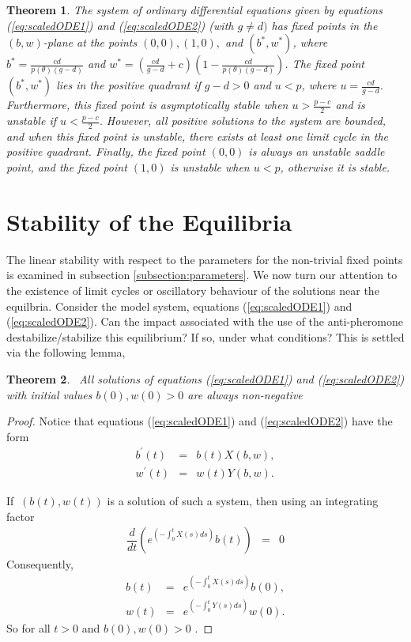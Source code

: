 \documentclass[review,authoryear]{elsarticle}
\newtheorem{theorem}{Theorem}[section]
\begin{document}
\begin{theorem}
  The system of ordinary differential equations given by equations (\ref{eq:scaledODE1}) and (\ref{eq:scaledODE2}) (with $g\ne d)$ has fixed points in the $(b,w)$-plane at the points $(0,0), (1,0),$ and $(b^*,w^*)$, where $b^*=\frac{cd}{p(\theta)(g-d)}$ and
$w^*=\left(\frac{cd}{g-d}+c\right)\left(1-\frac{cd}{p(\theta)(g-d)}\right)$. 
 The  fixed point $(b^*,w^*)$ lies in the positive quadrant if $g-d>0$ and $u<p$, where $u=\frac{cd}{g-d}.$
Furthermore, this fixed point is asymptotically stable when $u>\frac{p-c}{2}$ and is unstable if $u<\frac{p-c}{2}.$ However, all positive solutions to the system are bounded, and when this fixed point is unstable, there exists at least one  limit cycle in the positive quadrant.
Finally, the fixed point $(0,0)$ is always an unstable saddle point, and the fixed point $(1,0)$ is unstable when $u<p$, otherwise it is stable.
\end{theorem}

\section{Stability of the Equilibria}
\label{appendix:stability}

The linear stability with respect to the parameters for the
non-trivial fixed points is examined in subsection 
\ref{subsection:parameters}. We now turn our attention to the
existence of limit cycles or oscillatory behaviour of the solutions
near the equilbria. Consider the model system, equations
(\ref{eq:scaledODE1}) and (\ref{eq:scaledODE2}). Can the impact
associated with the use of the anti-pheromone destabilize/stabilize
this equilibrium? If so, under what conditions? This is settled via
the following lemma,
\begin{theorem}
  \bigskip\ All solutions of equations (\ref{eq:scaledODE1}) and
  (\ref{eq:scaledODE2}) with initial values
  $b\left( 0\right) ,w\left( 0\right) >0$ are always non-negative
\end{theorem}


\begin{proof}
  Notice that equations (\ref{eq:scaledODE1}) and
  (\ref{eq:scaledODE2}) have the form
\begin{eqnarray}
  b^{\prime}\left( t \right) & = & b(t)X\left( b,w\right), \\
  w^{\prime}\left( t \right) & = & w(t)Y\left( b,w\right).
\end{eqnarray}


If $\ \left( b\left( t\right) ,w\left( t\right) \right)
$ is a solution of such a system, then using an integrating factor
\begin{eqnarray}
\dfrac{d}{dt}\left( e^{\left( -\int_{0}^{t}X(s)ds\right) }b(t)\right) & = & 0
\end{eqnarray}
Consequently,
\begin{eqnarray}
b(t) & = & e^{\left( -\int_{0}^{t}X(s)ds\right) }b(0), \\
w(t) & = & e^{\left( -\int_{0}^{t}Y(s)ds\right) }w(0).
\end{eqnarray}
So for all $t>0$ and $b\left( 0\right) ,w\left( 0\right) >0$ .
\end{proof}
\end{document}
